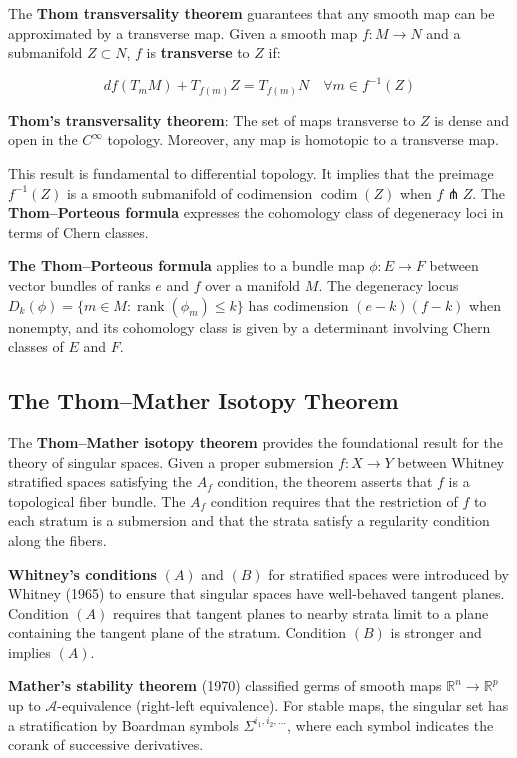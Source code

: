 The \textbf{Thom transversality theorem} guarantees that any smooth map can be
approximated by a transverse map. Given a smooth map $f: M \to N$ and a
submanifold $Z \subset N$, $f$ is \textbf{transverse} to $Z$ if:

\[df(T_m M) + T_{f(m)} Z = T_{f(m)} N \quad \forall m \in f^{-1}(Z)\]

\textbf{Thom's transversality theorem}: The set of maps transverse to $Z$ is
dense and open in the $C^\infty$ topology. Moreover, any map is homotopic to a
transverse map.

This result is fundamental to differential topology. It implies that the
preimage $f^{-1}(Z)$ is a smooth submanifold of codimension $\operatorname{codim}(Z)$
when $f \pitchfork Z$. The \textbf{Thom--Porteous formula} expresses the
cohomology class of degeneracy loci in terms of Chern classes.

\textbf{The Thom--Porteous formula} applies to a bundle map $\phi: E \to F$
between vector bundles of ranks $e$ and $f$ over a manifold $M$. The degeneracy
locus $D_k(\phi) = \{m \in M : \operatorname{rank}(\phi_m) \leq k\}$ has
codimension $(e-k)(f-k)$ when nonempty, and its cohomology class is given by
a determinant involving Chern classes of $E$ and $F$.

\subsection{The Thom--Mather Isotopy Theorem}

The \textbf{Thom--Mather isotopy theorem} provides the foundational result
for the theory of singular spaces. Given a proper submersion $f: X \to Y$
between Whitney stratified spaces satisfying the $A_f$ condition, the theorem
asserts that $f$ is a topological fiber bundle. The $A_f$ condition requires
that the restriction of $f$ to each stratum is a submersion and that the
strata satisfy a regularity condition along the fibers.

\textbf{Whitney's conditions} $(A)$ and $(B)$ for stratified spaces were
introduced by Whitney (1965) to ensure that singular spaces have well-behaved
tangent planes. Condition $(A)$ requires that tangent planes to nearby strata
limit to a plane containing the tangent plane of the stratum. Condition $(B)$
is stronger and implies $(A)$.

\textbf{Mather's stability theorem} (1970) classified germs of smooth maps
$\mathbb{R}^n \to \mathbb{R}^p$ up to $\mathcal{A}$-equivalence (right-left
equivalence). For stable maps, the singular set has a stratification by
Boardman symbols $\Sigma^{i_1,i_2,\ldots}$, where each symbol indicates the
corank of successive derivatives.

